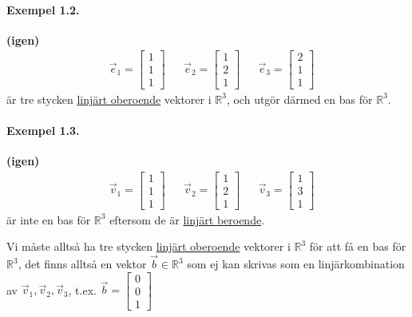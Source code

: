\begin{mdframed}
	\paragraph{Exempel 1.2.} %
	\label{par:ex_}
	\textbf{(igen)}\\
	\begin{align*}
	&\vec{e}_1 = \begin{bmatrix} 1\\1\\1 \end{bmatrix}
	&&\vec{e}_2 = \begin{bmatrix} 1\\2\\1 \end{bmatrix}
	&&\vec{e}_3	= \begin{bmatrix} 2\\1\\1 \end{bmatrix}
	\end{align*}
	är tre stycken \underline{linjärt oberoende} vektorer i $\mathbb{R}^3$, och utgör därmed en bas för $\mathbb{R}^3$.
\end{mdframed}
\begin{mdframed}
	\paragraph{Exempel 1.3.} %
	\label{par:exempel_1_3_}
	\textbf{(igen)}\\
	\begin{align*}
	& \vec{v}_1 = \begin{bmatrix} 1\\1\\1 \end{bmatrix}
	&& \vec{v}_2 = \begin{bmatrix} 1\\2\\1 \end{bmatrix}
	&& \vec{v}_3 = \begin{bmatrix} 1\\3\\1 \end{bmatrix}
	\end{align*}
	är inte en bas för $\mathbb{R}^3$ eftersom de är \underline{linjärt beroende}.
\end{mdframed}
Vi måste alltså ha tre stycken \underline{linjärt oberoende} vektorer i $\mathbb{R}^3$ för att få en bas för $\mathbb{R}^3$, det finns alltså en vektor $\vec{b} \in \mathbb{R}^3$ som ej kan skrivas som en linjärkombination av $\vec{v}_1, \vec{v}_2, \vec{v}_3$, t.ex. $\vec{b} = \begin{bmatrix} 0\\0\\1 \end{bmatrix}$\\
